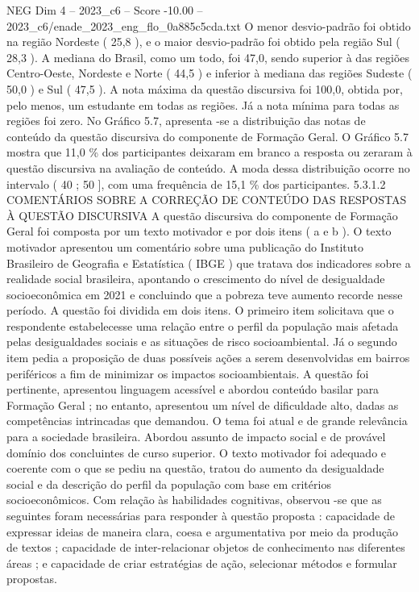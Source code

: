 \begin{textsample}{NEG Dim 4 – 2023\_c6 – Score -10.00 – 2023\_c6/enade\_2023\_eng\_flo\_0a885c5cda.txt}
O menor desvio-padrão foi obtido na região Nordeste ( 25,8 ), e o maior desvio-padrão foi obtido pela região Sul ( 28,3 ).
A mediana do Brasil, como um todo, foi 47,0, sendo superior à das regiões Centro-Oeste, Nordeste e Norte ( 44,5 ) e inferior à mediana das regiões Sudeste ( 50,0 ) e Sul ( 47,5 ).
A nota máxima da questão discursiva foi 100,0, obtida por, pelo menos, um estudante em todas as regiões.
Já a nota mínima para todas as regiões foi zero.
No Gráfico 5.7, apresenta -se a distribuição das notas de conteúdo da questão discursiva do componente de Formação Geral.
O Gráfico 5.7 mostra que 11,0 \% dos participantes deixaram em branco a resposta ou zeraram à questão discursiva na avaliação de conteúdo.
A moda dessa distribuição ocorre no intervalo ( 40 ; 50 ], com uma frequência de 15,1 \% dos participantes. 5.3.1.2 COMENTÁRIOS SOBRE A CORREÇÃO DE CONTEÚDO DAS RESPOSTAS À QUESTÃO DISCURSIVA A questão discursiva do componente de Formação Geral foi composta por um texto motivador e por dois itens ( a e b ).
O texto motivador apresentou um comentário sobre uma publicação do Instituto Brasileiro de Geografia e Estatística ( IBGE ) que tratava dos indicadores sobre a realidade social brasileira, apontando o crescimento do nível de desigualdade socioeconômica em 2021 e concluindo que a pobreza teve aumento recorde nesse período.
A questão foi dividida em dois itens.
O primeiro item solicitava que o respondente estabelecesse uma relação entre o perfil da população mais afetada pelas desigualdades sociais e as situações de risco socioambiental.
Já o segundo item pedia a proposição de duas possíveis ações a serem desenvolvidas em bairros periféricos a fim de minimizar os impactos socioambientais.
A questão foi pertinente, apresentou linguagem acessível e abordou conteúdo basilar para Formação Geral ; no entanto, apresentou um nível de dificuldade alto, dadas as competências intrincadas que demandou.
O tema foi atual e de grande relevância para a sociedade brasileira.
Abordou assunto de impacto social e de provável domínio dos concluintes de curso superior.
O texto motivador foi adequado e coerente com o que se pediu na questão, tratou do aumento da desigualdade social e da descrição do perfil da população com base em critérios socioeconômicos.
Com relação às habilidades cognitivas, observou -se que as seguintes foram necessárias para responder à questão proposta : capacidade de expressar ideias de maneira clara, coesa e argumentativa por meio da produção de textos ; capacidade de inter-relacionar objetos de conhecimento nas diferentes áreas ; e capacidade de criar estratégias de ação, selecionar métodos e formular propostas.

\end{textsample}
